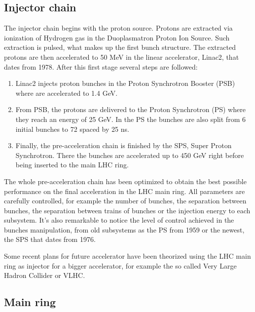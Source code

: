 \subsection{Injector chain}
\label{sec:injector}

The injector chain begins with the proton source. Protons are extracted via ionization of Hydrogen gas in the Duoplasmatron Proton Ion Source. Such extraction is pulsed, what makes up the first bunch structure. The extracted protons are then accelerated to 50 MeV in the linear accelerator, Linac2, that dates from 1978. After this first stage several steps are followed:
\begin{enumerate}
\item Linac2 injects proton bunches in the Proton Synchrotron Booster (PSB) where are accelerated to 1.4 GeV. 
\item From PSB, the protons are delivered to the Proton Synchrotron (PS) where they reach an energy of 25 GeV. In the PS the bunches are also split from 6 initial bunches to 72 spaced by 25 ns.
\item Finally, the pre-acceleration chain is finished by the SPS, Super Proton Synchrotron. There the bunches are accelerated up to 450 GeV right before being inserted to the main LHC ring. 
\end{enumerate}

The whole pre-acceleration chain has been optimized to obtain the best possible performance on the final acceleration in the LHC main ring. All parameters are carefully controlled, for example the number of bunches, the separation between bunches, the separation between trains of bunches or the injection energy to each subsystem. It's also remarkable to notice the level of control achieved in the bunches manipulation, from old subsystems as the PS from 1959 or the newest, the SPS that dates from 1976. 

Some recent plans for future accelerator have been theorized using the LHC main ring as injector for a bigger accelerator, for example the so called Very Large Hadron Collider or VLHC.  

\subsection{Main ring}
\label{sec:ring}


